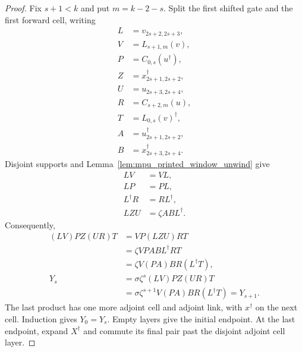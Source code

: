 \begin{proof}\leanok
    Fix $s+1<k$ and put $m=k-2-s$. Split the first shifted gate and
    the first forward cell, writing
    \begin{align*}
        L & =v_{2s+2,2s+3},         \\
        V & =L_{s+1,m}(v),          \\
        P & =C_{0,s}(u^\dagger),    \\
        Z & =x_{2s+1,2s+2}^\dagger, \\
        U & =u_{2s+3,2s+4},         \\
        R & =C_{s+2,m}(u),          \\
        T & =L_{0,s}(v)^\dagger,    \\
        A & =u_{2s+1,2s+2}^\dagger, \\
        B & =x_{2s+3,2s+4}^\dagger.
    \end{align*}
    Disjoint supports and Lemma~\ref{lem:mpu_printed_window_unwind} give
    \begin{align*}
        LV          & =VL,                \\
        LP          & =PL,                \\
        L^\dagger R & =RL^\dagger,        \\
        LZU         & =\zeta ABL^\dagger.
    \end{align*}
    Consequently,
    \begin{align*}
        (LV)PZ(UR)T
         & =VP(LZU)RT                                      \\
         & =\zeta VPABL^\dagger RT                         \\
         & =\zeta V(PA)BR(L^\dagger T),                    \\
        Y_s
         & =\sigma\zeta^s(LV)PZ(UR)T                       \\
         & =\sigma\zeta^{s+1}V(PA)BR(L^\dagger T)=Y_{s+1}.
    \end{align*}
    The last product has one more adjoint cell and adjoint link, with
    $x^\dagger$ on the next cell. Induction gives $Y_0=Y_s$.
    Empty layers give the initial endpoint. At the last endpoint,
    expand $X^\dagger$ and commute its final pair past the disjoint
    adjoint cell layer.
\end{proof}

